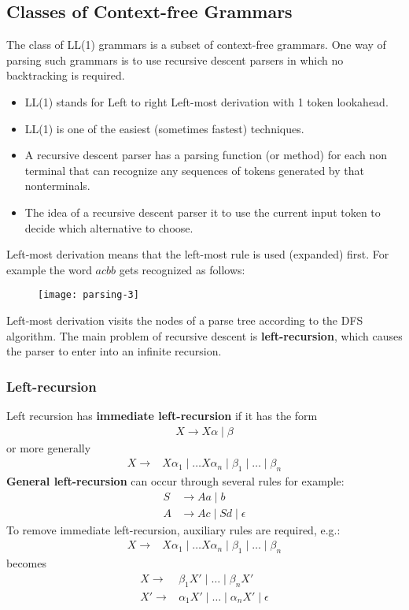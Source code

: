 \subsection{Classes of Context-free Grammars}
The class of LL(1) grammars is a subset of context-free
grammars. One way of parsing such grammars is to use recursive
descent parsers in which no backtracking is required.
\begin{itemize}
\item LL(1) stands for Left to right Left-most derivation with 1
token lookahead.
\item LL(1) is one of the easiest (sometimes fastest) techniques.
\item A recursive descent parser has a parsing function (or method)
for each non terminal that can recognize any sequences of
tokens generated by that nonterminals.
\item The idea of a recursive descent parser it to use the current
input token to decide which alternative to choose.
\end{itemize}
Left-most derivation means that the left-most rule is used (expanded) first.
For example the word $acbb$ gets recognized as follows:
\begin{figure}[H]
  \centering
  \texttt{[image: parsing-3]}
\end{figure}
Left-most derivation visits the nodes of a parse tree according to the DFS algorithm.
The main problem of recursive descent is \textbf{left-recursion}, which causes 
the parser to enter into an infinite recursion.\\

\subsubsection{Left-recursion}
Left recursion has \textbf{immediate left-recursion} if it has the form
\begin{align*}
  X \rightarrow X\alpha \mid \beta
\end{align*} 
or more generally
\begin{align*}
  X \rightarrow & X\alpha_1  \mid \dots X\alpha_n \mid \beta_1
   \mid \dots \mid \beta_n
\end{align*} 
\textbf{General left-recursion} can occur through several rules for example:
\begin{align*}
  S & \rightarrow Aa \mid b\\
  A & \rightarrow Ac \mid Sd \mid \epsilon
\end{align*}
To remove immediate left-recursion, auxiliary rules are required, e.g.:
\begin{align*}
  X \rightarrow & X\alpha_1  \mid \dots X\alpha_n \mid \beta_1
   \mid \dots \mid \beta_n
\end{align*} 
becomes 
\begin{align*}
  X \rightarrow & \beta_1 X' \mid \dots \mid \beta_n X'\\
  X' \rightarrow & \alpha_1X' \mid \dots \mid \alpha_n X' \mid \epsilon
\end{align*}

